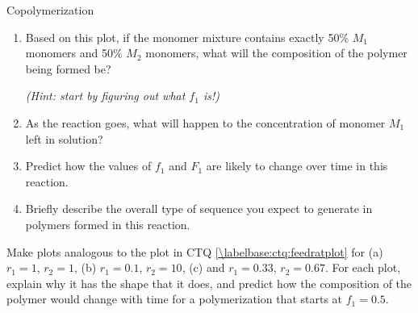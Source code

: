 \begin{activity}{Copolymerization}
\begin{ctqs}
\begin{enumerate}
			
			\item Based on this plot, if the monomer mixture contains exactly 50\% $M_1$ monomers and 50\% $M_2$ monomers, what will the composition of the polymer being formed be? 
			
				\emph{(Hint: start by figuring out what $f_1$ is!)}
				
				\begin{solution}[0.5in]
				\end{solution}
			
			\item As the reaction goes, what will happen to the concentration of monomer $M_1$ left in solution?
				
				\begin{solution}[1in]
				\end{solution}
			
			\item Predict how the values of $f_1$ and $F_1$ are likely to change over time in this reaction.
				
				\begin{solution}[1in]
				\end{solution}
			
			\item Briefly describe the overall type of sequence you expect to generate in polymers formed in this reaction.
				
				\begin{solution}[1in]
				\end{solution}
		\end{enumerate}
\end{ctqs}


\begin{exercises}

	\exercise Make plots analogous to the plot in CTQ \ref{\labelbase:ctq:feedratplot} for (a) $r_1=1$, $r_2=1$, (b) $r_1=0.1$, $r_2=10$, (c) and $r_1=0.33$, $r_2 = 0.67$.  For each plot, explain why it has the shape that it does, and predict how the composition of the polymer would change with time for a polymerization that starts at $f_1=0.5$.
	
\end{exercises}


%
%	


	
\end{activity}